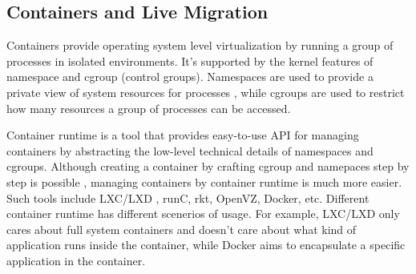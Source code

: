 

\subsection{Containers and Live Migration}

Containers provide operating system level virtualization by running a group of processes in isolated environments. It's supported by the kernel features of namespace 
 and cgroup (control groups)\cite{rosen2014container}.
Namespaces are used to provide a private view of system resources for processes \cite{pike1992plan9}, while cgroups are used to restrict how many resources a group of processes can be accessed\cite{rosen2013namespaceIntro}.  


Container runtime is a tool that provides easy-to-use API for managing containers by abstracting the low-level technical details of namespaces and cgroups. 
Although creating a container by crafting cgroup and namepaces step by step is possible \cite{conScratch}, managing containers by container runtime is much more easier.  Such tools include LXC/LXD\cite{LXC} ,
runC\cite{runc},
rkt\cite{rkt}, 
OpenVZ\cite{openvz}, 
Docker\cite{docker}, etc. Different container runtime has different scenerios of usage. For example, LXC/LXD only cares about full system containers and doesn’t care about what kind of application runs inside the container, while Docker aims to encapsulate a specific application in the container.  

